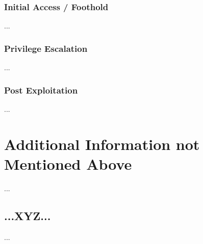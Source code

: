 \subsubsection{Initial Access / Foothold}\label{oscp-sec:sec5-dc1-init}
%
...
%
%
%
\subsubsection{Privilege Escalation}\label{oscp-sec:sec5-dc1-priv}
%
...
%
%
%
\subsubsection{Post Exploitation}\label{oscp-sec:sec5-dc1-post}
%
...
%
%
%
\section{Additional Information not Mentioned Above}\label{oscp-sec:last}
%
...
%
%
%
\subsection{...XYZ...}\label{oscp-sec:last-xyz}
%
...
%
%
%

